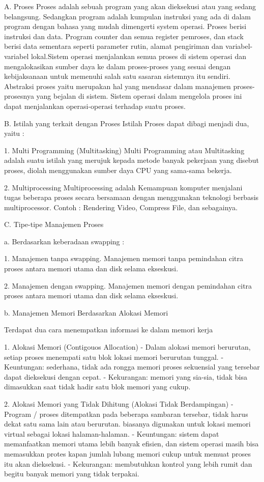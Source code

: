 A. Proses
Proses adalah sebuah program yang akan dieksekusi atau yang sedang belangsung. Sedangkan program adalah kumpulan instruksi yang ada di dalam program dengan bahasa yang mudah dimengerti system operasi. Proses berisi instruksi dan data. Program counter dan semua register pemroses, dan stack berisi data sementara seperti parameter rutin, alamat pengiriman dan variabel-variabel lokal.Sistem operasi menjalankan semua proses di sistem operasi dan mengalokasikan sumber daya ke dalam proses-proses yang sesuai dengan kebijaksanaan untuk memenuhi salah satu sasaran sistemnya itu sendiri. Abstraksi proses yaitu merupakan  hal yang mendasar dalam manajemen proses-prosesnya yang bejalan di sistem. Sistem operasi dalam mengelola proses ini dapat menjalankan operasi-operasi terhadap suatu proses.


B. Istilah yang terkait dengan Proses
Istilah Proses dapat dibagi menjadi dua, yaitu :

1. Multi Programming (Multitasking)
Multi Programming atau Multitasking adalah suatu istilah yang merujuk kepada metode banyak pekerjaan yang disebut proses, diolah menggunakan sumber daya CPU yang sama-sama bekerja.

2. Multiprocessing
Multiprocessing adalah Kemampuan komputer menjalani tugas beberapa proses secara bersamaan dengan menggunakan teknologi berbasis multiprocessor.
Contoh : Rendering Video, Compress File, dan sebagainya.


C. Tipe-tipe Manajemen Proses

a. Berdasarkan keberadaan swapping :

1. Manajemen tanpa swapping.
Manajemen memori tanpa pemindahan citra proses antara memori utama dan disk selama ekseskusi.

2. Manajemen dengan swapping.
Manajemen memori dengan pemindahan citra proses antara memori utama dan disk selama ekseskusi.

b. Manajemen Memori Berdasarkan Alokasi Memori

Terdapat dua cara menempatkan informasi ke dalam memori kerja

1. Alokasi Memori (Contigouos Allocation)
- Dalam alokasi memori berurutan, setiap proses menempati satu blok
lokasi memori berurutan tunggal.
- Keuntungan: sederhana, tidak ada rongga memori
proses sekuensial yang tersebar dapat dieksekusi dengan cepat.
- Kekurangan: memori yang sia-sia, tidak bisa dimasukkan saat tidak hadir
satu blok memori yang cukup.

2. Alokasi Memori yang Tidak Dihitung (Alokasi Tidak Berdampingan)
- Program / proses ditempatkan pada beberapa sambaran tersebar,
tidak harus dekat satu sama lain atau berurutan. biasanya digunakan
untuk lokasi memori virtual sebagai lokasi halaman-halaman.
- Keuntungan: sistem dapat memanfaatkan memori utama lebih banyak
efisien, dan sistem operasi masih bisa memasukkan protes kapan
jumlah lubang memori cukup untuk memuat proses itu
akan dieksekusi.
- Kekurangan: membutuhkan kontrol yang lebih rumit dan
begitu banyak memori yang tidak terpakai.

